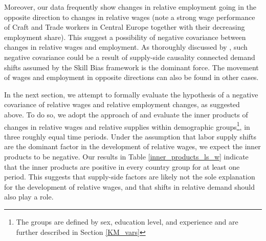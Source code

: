 \documentclass[11pt]{article}
\begin{document}


Moreover, our data frequently show changes in relative employment going in the opposite direction to changes in relative wages (note a strong wage performance of Craft and Trade workers in Central Europe together with their decreasing employment share). This suggest a possibility of negative covariance between changes in relative wages and employment. As thoroughly discussed by \citep{katz1992changes},  such negative covariance could be a result of supply-side causality connected demand shifts assumed by the Skill Bias framework is the dominant force. The movement of wages and employment in opposite directions can also be found in other cases.


In the next section, we attempt to formally evaluate the hypothesis of a negative covariance of relative wages and relative employment changes, as suggested above. To do so, we adopt the approach of \cite{katz1992changes} and evaluate the inner products of changes in relative wages and relative supplies within demographic groups\footnote{The groups are defined by sex, education level, and experience and are further described in Section \ref{KM_vars}}, in three roughly equal time periods. Under the assumption that labor supply shifts are the dominant factor in the development of relative wages, we expect the inner products to be negative. Our results in Table \ref{inner_products_ls_w} indicate that the inner products are positive in every country group for at least one period. This suggests that supply-side factors are likely not the sole explanation for the development of relative wages, and that shifts in relative demand should also play a role.
\end{document}
